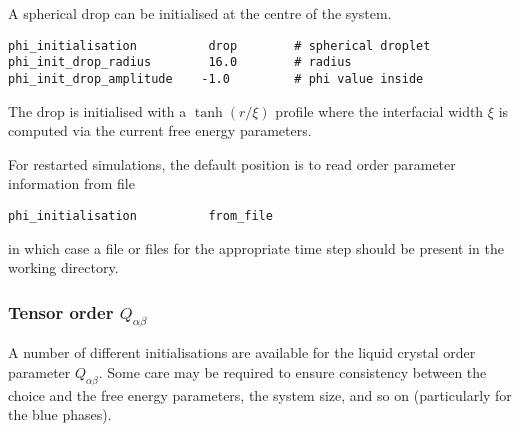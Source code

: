 A spherical drop can be initialised at the centre of the system.
\begin{lstlisting}
phi_initialisation          drop        # spherical droplet
phi_init_drop_radius        16.0        # radius
phi_init_drop_amplitude    -1.0         # phi value inside
\end{lstlisting}
The drop is initialised with a $\tanh(r/\xi)$ profile where the
interfacial width $\xi$ is computed via the current free energy
parameters.


For restarted simulations, the default position is to read order
parameter information from file
\begin{lstlisting}
phi_initialisation          from_file
\end{lstlisting}
in which case a file or files for the appropriate time step should
be present in the working directory.


\subsubsection{Tensor order $Q_{\alpha\beta}$}

A number of different initialisations are available for the liquid
crystal order parameter $Q_{\alpha\beta}$. Some care may be required
to ensure consistency between the choice and the free energy
parameters, the system size, and so on (particularly for the blue phases).

